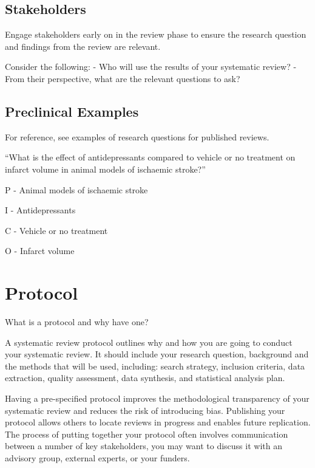 \documentclass[
]{book}
\begin{document}
\hypertarget{stakeholders}{%
\section{Stakeholders}\label{stakeholders}}

Engage stakeholders early on in the review phase to ensure the research question and findings from the review are relevant.

Consider the following:
- Who will use the results of your systematic review?
- From their perspective, what are the relevant questions to ask?

\hypertarget{preclinical-examples}{%
\section{Preclinical Examples}\label{preclinical-examples}}

For reference, see examples of research questions for published reviews.

``What is the effect of antidepressants compared to vehicle or no treatment on infarct volume in animal models of ischaemic stroke?''

P - Animal models of ischaemic stroke

I - Antidepressants

C - Vehicle or no treatment

O - Infarct volume

\hypertarget{protocol}{%
\chapter{Protocol}\label{protocol}}

What is a protocol and why have one?

A systematic review protocol outlines why and how you are going to conduct your systematic review. It should include your research question, background and the methods that will be used, including: search strategy, inclusion criteria, data extraction, quality assessment, data synthesis, and statistical analysis plan.

Having a pre-specified protocol improves the methodological transparency of your systematic review and reduces the risk of introducing bias. Publishing your protocol allows others to locate reviews in progress and enables future replication. The process of putting together your protocol often involves communication between a number of key stakeholders, you may want to discuss it with an advisory group, external experts, or your funders.
\end{document}
